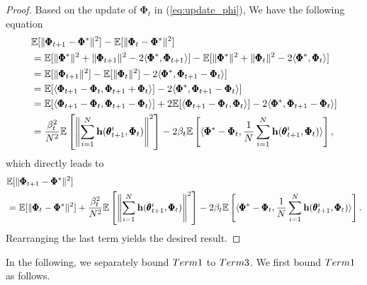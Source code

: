 \documentclass{article} %
\def\eqref#1{equation~\ref{#1}}
\theoremstyle{plain}
\theoremstyle{definition}
\theoremstyle{remark}
\renewcommand{\eqref}[1]{(\ref{#1})}
\begin{document}
{\begin{proof}
Based on the update of $\pmb{\Phi}_t$ in \eqref{eq:update_phi}, We have the following equation 
\begin{align}
    &\mathbb{E}[\|\pmb{\Phi}_{t+1}-\pmb{\Phi}^*\|^2]-\mathbb{E}[\|\pmb{\Phi}_{t}-\pmb{\Phi}^*\|^2]\nonumber\\
    &=\mathbb{E}[\|\pmb{\Phi}^*\|^2+\|\pmb{\Phi}_{t+1}\|^2-2\langle{\pmb{\Phi}^*}, \pmb{\Phi}_{t+1}\rangle]-\mathbb{E}[\|\pmb{\Phi}^*\|^2+\|\pmb{\Phi}_{t}\|^2-2\langle{\pmb{\Phi}^*}, \pmb{\Phi}_{t}\rangle]\nonumber\\
    &=\mathbb{E}[\|\pmb{\Phi}_{t+1}\|^2]-\mathbb{E}[\|\pmb{\Phi}_{t}\|^2]-2\langle{\pmb{\Phi}^*}, \pmb{\Phi}_{t+1}-\pmb{\Phi}_t\rangle]\nonumber\\
    &=\mathbb{E}[\langle\pmb{\Phi}_{t+1}-\pmb{\Phi}_t, \pmb{\Phi}_{t+1}+\pmb{\Phi}_t\rangle]-2\langle{\pmb{\Phi}^*}, \pmb{\Phi}_{t+1}-\pmb{\Phi}_t\rangle]\nonumber\\
    &=\mathbb{E}[\langle\pmb{\Phi}_{t+1}-\pmb{\Phi}_t, \pmb{\Phi}_{t+1}-\pmb{\Phi}_t\rangle]+2\mathbb{E}[\langle\pmb{\Phi}_{t+1}-\pmb{\Phi}_t, \pmb{\Phi}_t\rangle]-2\langle{\pmb{\Phi}^*}, \pmb{\Phi}_{t+1}-\pmb{\Phi}_t\rangle]\nonumber\\
    &=\frac{\beta_t^2}{N^2}\mathbb{E}\left[\left\|\sum_{i=1}^N\mathbf{h}(\pmb{\theta}_{t+1}^i,\pmb{\Phi}_t)\right\|^2\right]-2\beta_t\mathbb{E}\left[\langle\pmb{\Phi}^*-\pmb{\Phi}_t, \frac{1}{N}\sum_{i=1}^N\mathbf{h}(\pmb{\theta}_{t+1}^i, \pmb{\Phi}_t)\rangle\right],
\end{align}
which directly leads to
\begin{align}
    &\mathbb{E}[\|\pmb{\Phi}_{t+1}-\pmb{\Phi}^*\|^2]\nonumber\\
    &=\mathbb{E}[\|\pmb{\Phi}_{t}-\pmb{\Phi}^*\|^2]+\frac{\beta_t^2}{N^2}\mathbb{E}\left[\left\|\sum_{i=1}^N\mathbf{h}(\pmb{\theta}_{t+1}^i, \pmb{\Phi}_t)\right\|^2\right]-2\beta_t\mathbb{E}\left[\langle\pmb{\Phi}^*-\pmb{\Phi}_t, \frac{1}{N}\sum_{i=1}^N\mathbf{h}(\pmb{\theta}_{t+1}^i, \pmb{\Phi}_t)\rangle\right].
\end{align}
Rearranging the last term yields the desired result.
\end{proof}


In the following, we separately bound $\textnormal{Term 1}$ to $\textnormal{Term 3}$. We first bound $\textnormal{Term 1}$ as follows.

}
\end{document}
